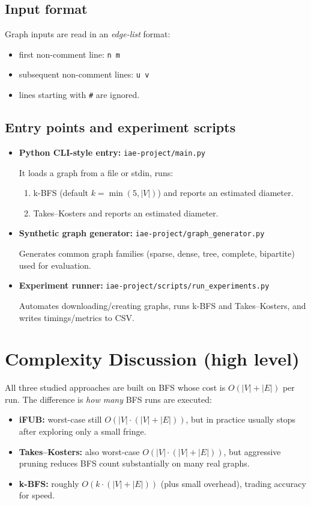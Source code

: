\documentclass[11pt]{article}
\begin{document}
\subsection{Input format}

Graph inputs are read in an \emph{edge-list} format:
\begin{itemize}
  \item first non-comment line: \texttt{n m}
  \item subsequent non-comment lines: \texttt{u v}
  \item lines starting with \texttt{\#} are ignored.
\end{itemize}

\subsection{Entry points and experiment scripts}

\begin{itemize}
  \item \textbf{Python CLI-style entry:} \texttt{iae-project/main.py}

  It loads a graph from a file or stdin, runs:
  \begin{enumerate}
    \item k-BFS (default $k=\min(5,|V|)$) and reports an estimated diameter.
    \item Takes--Kosters and reports an estimated diameter.
  \end{enumerate}

  \item \textbf{Synthetic graph generator:} \texttt{iae-project/graph\_generator.py}

  Generates common graph families (sparse, dense, tree, complete, bipartite) used for evaluation.

  \item \textbf{Experiment runner:} \texttt{iae-project/scripts/run\_experiments.py}

  Automates downloading/creating graphs, runs k-BFS and Takes--Kosters, and writes timings/metrics to CSV.
\end{itemize}

\section{Complexity Discussion (high level)}

All three studied approaches are built on BFS whose cost is $O(|V|+|E|)$ per run. The difference is \emph{how many} BFS runs are executed:
\begin{itemize}
  \item \textbf{iFUB:} worst-case still $O(|V|\cdot(|V|+|E|))$, but in practice usually stops after exploring only a small fringe.
  \item \textbf{Takes--Kosters:} also worst-case $O(|V|\cdot(|V|+|E|))$, but aggressive pruning reduces BFS count substantially on many real graphs.
  \item \textbf{k-BFS:} roughly $O(k\cdot(|V|+|E|))$ (plus small overhead), trading accuracy for speed.
\end{itemize}
\end{document}
